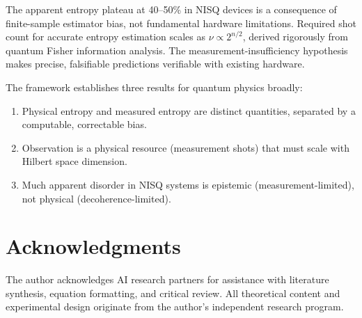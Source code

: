 \documentclass[12pt,letterpaper]{article}
\theoremstyle{plain}
\theoremstyle{definition}
\begin{document}
The apparent entropy plateau at 40--50\% in NISQ devices is a consequence of finite-sample
estimator bias, not fundamental hardware limitations.  Required shot count for accurate entropy
estimation scales as $\nu \propto 2^{n/2}$, derived rigorously from quantum Fisher information
analysis.  The measurement-insufficiency hypothesis makes precise, falsifiable predictions
verifiable with existing hardware.

The framework establishes three results for quantum physics broadly:
\begin{enumerate}
  \item Physical entropy and measured entropy are distinct quantities, separated by a
        computable, correctable bias.
  \item Observation is a physical resource (measurement shots) that must scale with Hilbert
        space dimension.
  \item Much apparent disorder in NISQ systems is epistemic (measurement-limited), not
        physical (decoherence-limited).
\end{enumerate}

\section*{Acknowledgments}
The author acknowledges AI research partners for assistance with literature synthesis, equation
formatting, and critical review.  All theoretical content and experimental design originate from
the author's independent research program.
\end{document}
